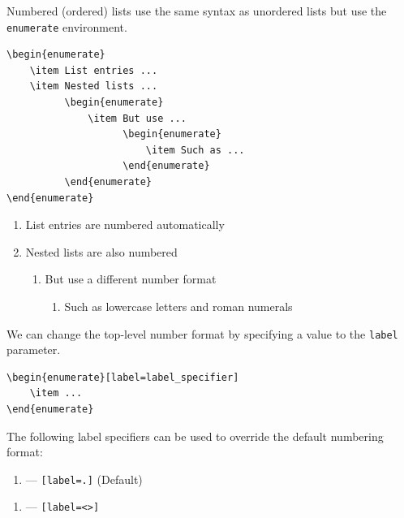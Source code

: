 \documentclass[11pt, twoside]{article}
\begin{document}
Numbered (ordered) lists use the same syntax as unordered lists but use the \texttt{enumerate} environment.
\begin{verbatim}
\begin{enumerate}
    \item List entries ...
    \item Nested lists ...
          \begin{enumerate}
              \item But use ...
                    \begin{enumerate}
                        \item Such as ...
                    \end{enumerate}
          \end{enumerate}
\end{enumerate}
\end{verbatim}
\begin{outputbox}
    \begin{enumerate}
        \item List entries are numbered automatically
        \item Nested lists are also numbered
              \begin{enumerate}
                  \item But use a different number format
                        \begin{enumerate}
                            \item Such as lowercase letters and roman numerals
                        \end{enumerate}
              \end{enumerate}
    \end{enumerate}
\end{outputbox}
We can change the top-level number format by specifying a value to the \texttt{label}
parameter.
\begin{verbatim}
\begin{enumerate}[label=label_specifier]
    \item ...
\end{enumerate}
\end{verbatim}
The following label specifiers can be used to override the default numbering format:
\begin{enumerate}[label=\arabic*.]
    \item --- \texttt{[label=\arabic*.]} (Default)
\end{enumerate}
\begin{enumerate}[label=<\Roman*>]
    \item --- \texttt{[label=<\Roman*>]}
\end{enumerate}
\end{document}
